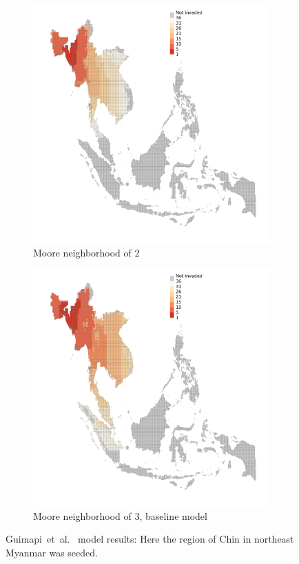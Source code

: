 \documentclass[10pt]{article}
\theoremstyle{definition}
\begin{document}
\begin{figure}[ht]
    \begin{subfigure}[b]{.48\textwidth}
\centering
\includegraphics[width=\textwidth]{figs/plot_Myanmar2.pdf}
\caption{Moore neighborhood of 2}
\end{subfigure}
\begin{subfigure}[b]{.48\textwidth}
\centering
\includegraphics[width=\textwidth]{figs/plot_Myanmar3.pdf}
\caption{Moore neighborhood of 3, baseline model}
\end{subfigure}
\caption{Guimapi~et~al.~\cite{guimapi2016modeling} model results: 
Here the region of Chin in northeast Myanmar was seeded.
    \label{fig:baselineMyanmar}}
\end{figure}



\end{document}
